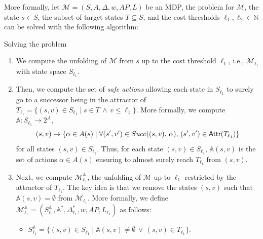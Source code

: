 More formally, let $\mathcal{M}=(S, A, \Delta, w, AP, L)$ be an MDP, the \SSPWE{} problem for $\mathcal{M}$, the state $s \in S$, the subset of target states $T \subseteq S$, and the cost thresholds $\ell_1, \ell_2 \in \mathbb{N}$ can be solved with the following algorithm:

\begin{algorithm}[H]
\caption{Solving the \SSPWE{} problem}\label{sspwe-algo}
\begin{enumerate}
  \item We compute the unfolding of $\mathcal{M}$ from $s$ up to the cost threshold $\ell_1$, i.e., $\mathcal{M}_{\ell_1}$ with state space $S_{\ell_1}$.
  \item Then, we compute the set of \textit{safe actions} allowing each state in $S_{\ell_1}$ to surely go to a successor being in the attractor of
  $T_{\ell_1} = \{ (s, v) \in S_{\ell_1} \; | \; s \in T \, \wedge \, v \leq \ell_1 \}$.
  More formally, we compute $\mathbb{A}: S_{\ell_1} \rightarrow 2^A$, \[ (s, v) \mapsto \{ \alpha \in A(s) \; | \; \forall (s', v') \in Succ((s, v), \, \alpha), \, (s', v') \in \textnormal{\sffamily Attr}(T_{\ell_1}) \}\]
  for all states $(s, v) \in S_{\ell_1}$. Thus, for each state $(s, v) \in S_{\ell_1}$, $\mathbb{A}(s, v)$
  is the set of actions $\alpha \in A(s)$ ensuring to almost surely reach $T_{\ell_1}$ from $(s, v)$.
  \item Next, we compute $\mathcal{M}^\mathbb{A}_{\ell_1}$, the unfolding of $\mathcal{M}$ up to $\ell_1$ restricted by the attractor of $T_{\ell_1}$. The key idea is that we remove the states $(s, v)$ such that $\mathbb{A}(s, v) = \emptyset$ from $\mathcal{M}_{\ell_1}$. More formally,
  we define $\mathcal{M}^\mathbb{A}_{\ell_1} = (S^\mathbb{A}_{\ell_1}, \mathbb{A}^*, \Delta^*_{\ell_1}, w, AP, L_{\ell_1})$ as follows:
  \begin{itemize}
    \item $S^\mathbb{A}_{\ell_1} = \{ (s, v) \in S_{\ell_1} \; | \; \mathbb{A}(s, v) \neq \emptyset \, \vee \, (s, v) \in T_{\ell_1} \}$.

\end{itemize}
\end{enumerate}
\end{algorithm}
